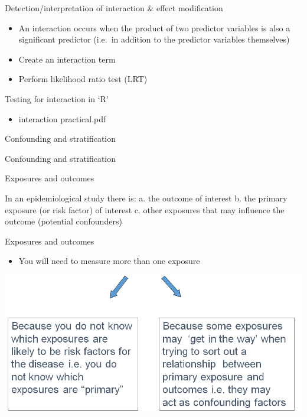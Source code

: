 \documentclass[ignorenonframetext,]{beamer}
\begin{document}
\begin{frame}{Detection/interpretation of interaction \& effect
modification}

\begin{itemize}
\itemsep1pt\parskip0pt
\item
  An interaction occurs when the product of two predictor variables is
  also a significant predictor (i.e.~in addition to the predictor
  variables themselves)
\item
  Create an interaction term
\item
  Perform likelihood ratio test (LRT)
\end{itemize}

\end{frame}

\begin{frame}{Testing for interaction in `R'}

\begin{itemize}
\itemsep1pt\parskip0pt
\item
  interaction practical.pdf
\end{itemize}

\end{frame}

\begin{frame}{Confounding and stratification}

Confounding and stratification

\end{frame}

\begin{frame}{Exposures and outcomes}

In an epidemiological study there is: a. the outcome of interest b. the
primary exposure (or risk factor) of interest c. other exposures that
may influence the outcome (potential confounders)

\end{frame}

\begin{frame}{Exposures and outcomes}

\begin{itemize}
\itemsep1pt\parskip0pt
\item
  You will need to measure more than one exposure
\end{itemize}

\includegraphics{lifestyle7.png}

\end{frame}
\end{document}
